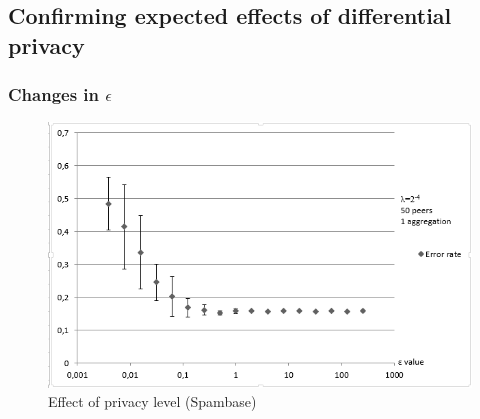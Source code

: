 \subsection{Confirming expected effects of differential privacy}
\subsubsection{Changes in $\epsilon$}
\begin{figure}[h]
	\centering
	\includegraphics[width=\textwidth]{fig/spambase/epsilon_big_range}
	\caption{Effect of privacy level (Spambase)}
	\label{fig:epsilon_big_range}
\end{figure}

